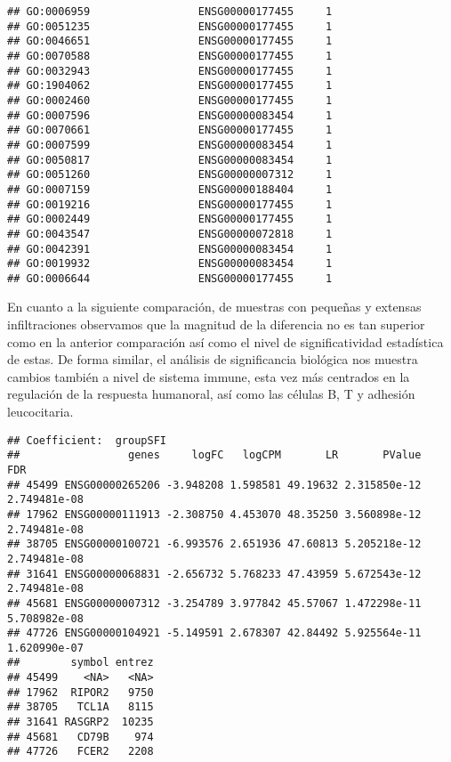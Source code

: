\documentclass[
]{article}
\begin{document}
\begin{verbatim}
## GO:0006959                 ENSG00000177455     1
## GO:0051235                 ENSG00000177455     1
## GO:0046651                 ENSG00000177455     1
## GO:0070588                 ENSG00000177455     1
## GO:0032943                 ENSG00000177455     1
## GO:1904062                 ENSG00000177455     1
## GO:0002460                 ENSG00000177455     1
## GO:0007596                 ENSG00000083454     1
## GO:0070661                 ENSG00000177455     1
## GO:0007599                 ENSG00000083454     1
## GO:0050817                 ENSG00000083454     1
## GO:0051260                 ENSG00000007312     1
## GO:0007159                 ENSG00000188404     1
## GO:0019216                 ENSG00000177455     1
## GO:0002449                 ENSG00000177455     1
## GO:0043547                 ENSG00000072818     1
## GO:0042391                 ENSG00000083454     1
## GO:0019932                 ENSG00000083454     1
## GO:0006644                 ENSG00000177455     1
\end{verbatim}

En cuanto a la siguiente comparación, de muestras con pequeñas y
extensas infiltraciones observamos que la magnitud de la diferencia no
es tan superior como en la anterior comparación así como el nivel de
significatividad estadística de estas. De forma similar, el análisis de
significancia biológica nos muestra cambios también a nivel de sistema
immune, esta vez más centrados en la regulación de la respuesta
humanoral, así como las células B, T y adhesión leucocitaria.

\begin{verbatim}
## Coefficient:  groupSFI 
##                 genes     logFC   logCPM       LR       PValue          FDR
## 45499 ENSG00000265206 -3.948208 1.598581 49.19632 2.315850e-12 2.749481e-08
## 17962 ENSG00000111913 -2.308750 4.453070 48.35250 3.560898e-12 2.749481e-08
## 38705 ENSG00000100721 -6.993576 2.651936 47.60813 5.205218e-12 2.749481e-08
## 31641 ENSG00000068831 -2.656732 5.768233 47.43959 5.672543e-12 2.749481e-08
## 45681 ENSG00000007312 -3.254789 3.977842 45.57067 1.472298e-11 5.708982e-08
## 47726 ENSG00000104921 -5.149591 2.678307 42.84492 5.925564e-11 1.620990e-07
##        symbol entrez
## 45499    <NA>   <NA>
## 17962  RIPOR2   9750
## 38705   TCL1A   8115
## 31641 RASGRP2  10235
## 45681   CD79B    974
## 47726   FCER2   2208
\end{verbatim}
\end{document}
